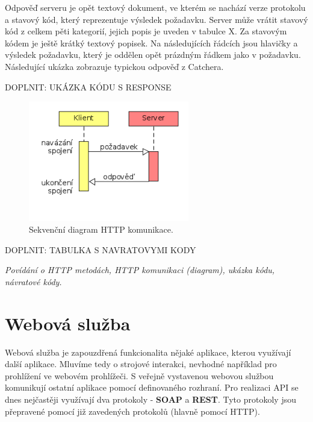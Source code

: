 \medskip

Odpověď serveru je opět textový dokument, ve kterém se nachází verze protokolu a stavový kód,
který reprezentuje výsledek požadavku. Server může vrátit stavový kód z celkem pěti kategorií,
jejich popis je uveden v tabulce X. Za stavovým kódem je ještě krátký textový popisek. Na následujících
řádcích jsou hlavičky a výsledek požadavku, který je oddělen opět prázdným řádkem jako v požadavku.
Následující ukázka zobrazuje typickou odpověď z Catchera. 

\medskip

DOPLNIT: UKÁZKA KÓDU S RESPONSE

\begin{figure}[ht!]
\centering
\includegraphics[width=70mm]{./images/http-komunikace.png}
\caption{Sekvenční diagram HTTP komunikace.\label{overflow}}
\end{figure}


DOPLNIT: TABULKA S NAVRATOVYMI KODY

\medskip

\textit{Povídání o HTTP metodách, HTTP komunikaci (diagram), ukázka kódu, návratové kódy.}


\section{Webová služba}

\indent

Webová služba je zapouzdřená funkcionalita nějaké aplikace, kterou využívají další aplikace.
Mluvíme tedy o strojové interakci, nevhodné například pro prohlížení ve webovém prohlížeči.
S veřejně vystavenou webovou službou komunikují ostatní aplikace pomocí definovaného rozhraní.
Pro realizaci API se dnes nejčastěji využívají dva protokoly - \textbf{SOAP} a \textbf{REST}.
Tyto protokoly jsou přepravené pomocí již zavedených protokolů (hlavně pomocí HTTP).